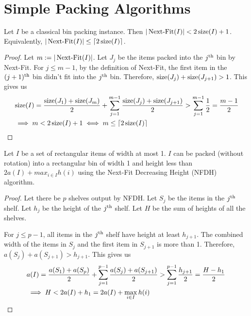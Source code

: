 \section{Simple Packing Algorithms}
\label{sec:preliminaries:simple-algos}

\begin{lemma}
\label{thm:next-fit}
Let $I$ be a classical bin packing instance. Then
$|\operatorname{Next-Fit}(I)| < 2\operatorname{size}(I) + 1$.
Equivalently, $|\operatorname{Next-Fit}(I)| \le \left\lceil 2\operatorname{size}(I) \right\rceil$.
\end{lemma}
\begin{proof}
Let $m := |\operatorname{Next-Fit}(I)|$.
Let $J_j$ be the items packed into the $j^{\textrm{th}}$ bin by Next-Fit.
For $j \le m-1$, by the definition of Next-Fit,
the first item in the $(j+1)^{\textrm{th}}$ bin didn't fit into the $j^{\textrm{th}}$ bin.
Therefore, $\operatorname{size}(J_j) + \operatorname{size}(J_{j+1}) > 1$. This gives us
\begin{align*}
& \operatorname{size}(I)
= \frac{\operatorname{size}(J_1) + \operatorname{size}(J_m)}{2} + \sum_{j=1}^{m-1} \frac{\operatorname{size}(J_j) + \operatorname{size}(J_{j+1})}{2}
> \sum_{j=1}^{m-1} \frac{1}{2} = \frac{m-1}{2}
\\ &\implies m < 2\operatorname{size}(I) + 1 \iff m \le \left\lceil 2\operatorname{size}(I) \right\rceil  \qedhere
\end{align*}
\end{proof}

\begin{lemma}
\label{thm:nfdh-strip}
Let $I$ be a set of rectangular items of width at most 1.
$I$ can be packed (without rotation) into a rectangular bin of width 1
and height less than $2a(I) + max_{i \in I} h(i)$
using the Next-Fit Decreasing Height (NFDH) algorithm.
\end{lemma}
\begin{proof}
Let there be $p$ shelves output by NFDH.
Let $S_j$ be the items in the $j^{\textrm{th}}$ shelf.
Let $h_j$ be the height of the $j^{\textrm{th}}$ shelf.
Let $H$ be the sum of heights of all the shelves.

For $j \le p-1$, all items in the $j^{\textrm{th}}$ shelf have height at least $h_{j+1}$.
The combined width of the items in $S_j$ and the first item in $S_{j+1}$ is more than 1.
Therefore, $a(S_j) + a(S_{j+1}) > h_{j+1}$. This gives us
\begin{align*}
& a(I) = \frac{a(S_1) + a(S_p)}{2} + \sum_{j=1}^{p-1} \frac{a(S_j) + a(S_{j+1})}{2}
> \sum_{j=1}^{p-1} \frac{h_{j+1}}{2} = \frac{H-h_1}{2}
\\ &\implies H < 2a(I) + h_1 = 2a(I) + \max_{i \in I} h(i)
\qedhere \end{align*}
\end{proof}

